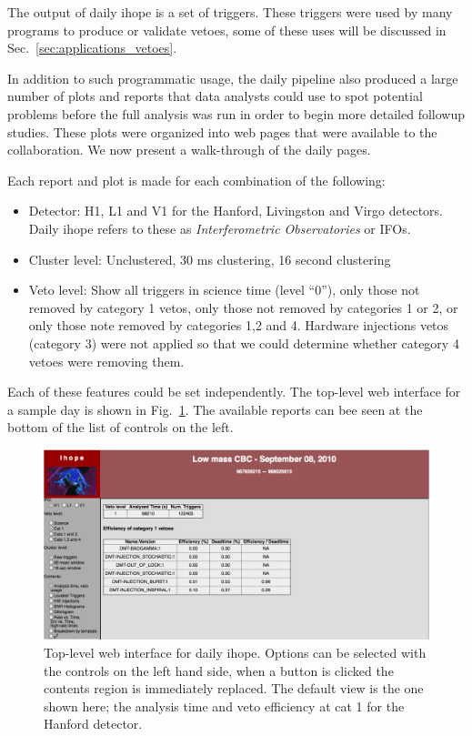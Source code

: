The output of daily ihope is a set of triggers.  These triggers were
used by many programs to produce or validate vetoes, some of these
uses will be discussed in Sec.~\ref{sec:applications_vetoes}.  

In addition to such programmatic usage, the daily pipeline also
produced a large number of plots and reports that data analysts could
use to spot potential problems before the full analysis was run in
order to begin more detailed followup studies.  These plots were
organized into web pages that were available to the collaboration.  We
now present a walk-through of the daily pages.

Each report and plot is made for each combination of the following:

\begin{itemize}
\item Detector: H1, L1 and V1 for the Hanford, Livingston and Virgo
detectors.  Daily ihope refers to these as \emph{Interferometric
Observatories} or IFOs.
\item Cluster level: Unclustered, 30 ms clustering, 16 second
clustering
\item Veto level: Show all triggers in science time (level ``0''),
only those not removed by category 1 vetos, only those not
removed by categories 1 or 2, or only those note removed by
categories 1,2 and 4.  Hardware injections vetos (category 3) were not 
applied so that we could determine whether category 4 vetoes were 
removing them.
\end{itemize}

Each of these features could be set independently.  The top-level web
interface for a sample day is shown in Fig.~\ref{f:daily_ihope_top}.
The available reports can bee seen at the bottom of the list of
controls on the left.

\begin{figure}
  \includegraphics[width=\linewidth]{figures/detchar/daily_ihope_top}
  \caption[Top-level web interface for daily ihope]{
  \label{f:daily_ihope_top}
Top-level web interface for daily ihope.  Options can be selected with
the controls on the left hand side, when a button is clicked the
contents region is immediately replaced.  The default view is the one
shown here; the analysis time and veto efficiency at cat 1 for the
Hanford detector.}
\end{figure}%


